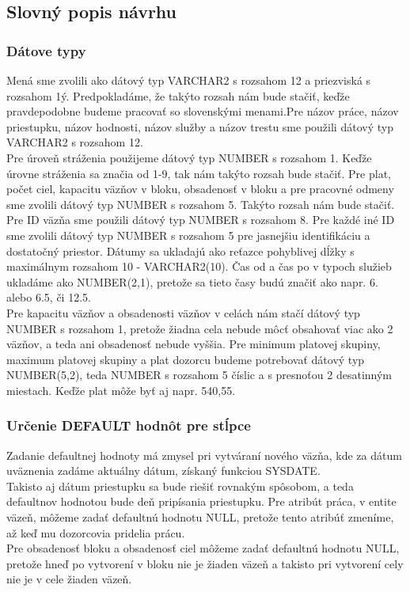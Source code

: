 \documentclass[slovak, 12pt, Times New Roman]{article}
\begin{document}
		\subsection{Slovný popis návrhu}
			\subsubsection{Dátove typy}
				Mená sme zvolili ako dátový typ VARCHAR2 s rozsahom 12 a priezviská s rozsahom 1ý. Predpokladáme, že takýto rozsah nám bude stačiť, keďže pravdepodobne budeme pracovať so slovenskými menami.Pre názov práce, názov priestupku, názov hodnosti, názov služby a názov trestu sme použili dátový typ VARCHAR2 s rozsahom 12. \\
				Pre úroveň stráženia použijeme dátový typ NUMBER s rozsahom 1. Keďže úrovne stráženia sa značia od 1-9, tak nám takýto rozsah bude stačiť. 
				Pre plat, počet ciel, kapacitu väzňov v bloku, obsadenosť v bloku a pre pracovné odmeny sme zvolili dátový typ NUMBER s rozsahom 5. Takýto rozsah nám bude stačiť.\\
				Pre ID väzňa sme použili dátový typ NUMBER s rozsahom 8.
				Pre každé iné ID sme zvolili dátový typ NUMBER s rozsahom 5 pre jasnejšiu identifikáciu a dostatočný priestor. 
				Dátumy sa ukladajú ako reťazce pohyblivej dĺžky s maximálnym rozsahom 10 - VARCHAR2(10).
				Čas od a čas po v typoch služieb ukladáme ako NUMBER(2,1), pretože sa tieto časy budú značiť ako napr. 6. alebo 6.5, či 12.5.\\
				Pre kapacitu väzňov a obsadenosti väzňov v celách nám stačí dátový typ NUMBER s rozsahom 1, pretože žiadna cela nebude môcť obsahovať viac ako 2 väzňov, a teda ani obsadenosť nebude vyššia. 
				Pre minimum platovej skupiny, maximum platovej skupiny a plat dozorcu budeme potrebovať dátový typ NUMBER(5,2), teda NUMBER s rozsahom 5 číslic a s presnoťou 2 desatinným miestach. Keďže plat môže byť aj napr. 540,55.
			\subsubsection{Určenie DEFAULT hodnôt pre stĺpce}
				Zadanie defaultnej hodnoty má zmysel pri vytváraní nového väzňa, kde za dátum uväznenia zadáme aktuálny dátum, získaný funkciou SYSDATE.\\
				Takisto aj dátum priestupku sa bude riešiť rovnakým spôsobom, a teda defaultnov hodnotou bude deň pripísania priestupku.
				Pre atribút práca, v entite väzeň, môžeme zadať defaultnú hodnotu NULL, pretože tento atribúť zmeníme, až keď mu dozorcovia pridelia prácu. \\
				Pre obsadenosť bloku a obsadenosť ciel môžeme zadať defaultnú hodnotu NULL, pretože hneď po vytvorení v bloku nie je žiaden väzeň a takisto pri vytvorení cely nie je v cele žiaden väzeň. 
			\clearpage
\end{document}
